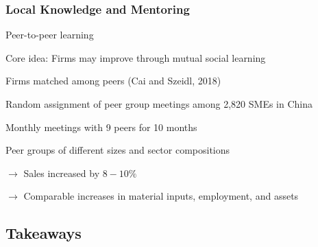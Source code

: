 \documentclass[hideothersubsections, usenames,dvipsnames,11pt]{beamer}
\newenvironment{itemize_2pt}{\itemize\addtolength{\itemsep}{2pt}}{\enditemize}
\begin{document}
\begin{frame}
\frametitle{Local Knowledge and Mentoring}

Peer-to-peer learning

\begin{itemize_2pt}
	\item Core idea: \textcolor{bdf}{Firms may improve through mutual social learning}
	
	\vspace{0.5em}
	
	\item Firms matched among peers \textcolor{camel}{(Cai and Szeidl, 2018)}
	\begin{itemize_2pt}
		\item Random assignment of \textcolor{bdf}{peer group meetings} among 2,820 SMEs in China
		\item Monthly meetings with 9 peers for 10 months
		\item Peer groups of different sizes and sector compositions
		
		\vspace{0.5em}
		
		\item[] $\rightarrow$ \textcolor{bdf}{Sales increased by $8-10\%$} 
		\item[] $\rightarrow$ Comparable increases in material inputs, employment, and assets

	\end{itemize_2pt}

\end{itemize_2pt}


\end{frame}






\subsection{Takeaways}
\end{document}
